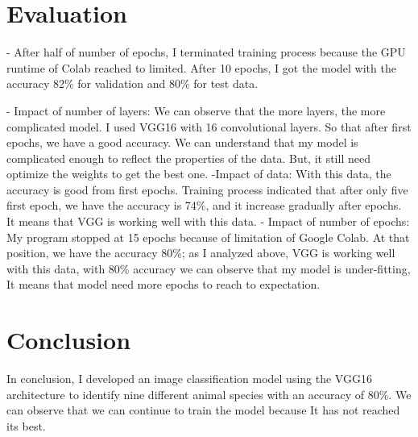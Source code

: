 \documentclass{article}
\begin{document}
\section{Evaluation}
- After half of number of epochs, I terminated training process because the GPU runtime of Colab reached to limited. After 10 epochs, I got the model with the accuracy 82\% for validation and  80\% for test data.

- Impact of number of layers: We can observe that the more layers, the more complicated model. I used VGG16 with 16 convolutional layers. So that after first epochs, we have a good accuracy. We can understand that my model is complicated enough to reflect the properties of the data. But, it still need optimize the weights to get the best one.
-Impact of data: With this data, the accuracy is good from first epochs. Training process indicated that after only five first epoch, we have the accuracy is 74\%, and it increase gradually after epochs. It means that VGG is working well with this data.
- Impact of number of epochs: My program stopped at 15 epochs because of limitation of Google Colab. At that position, we have the accuracy 80\%; as I analyzed above, VGG is working well with this data, with 80\% accuracy we can observe that my model is under-fitting, It means that model need more epochs to reach to expectation. 
\section{Conclusion}
In conclusion, I developed an image classification model using the VGG16 architecture to identify nine different animal species with an accuracy of 80\%. We can observe that we can continue to train the model because It has not reached its best.   
\end{document}

